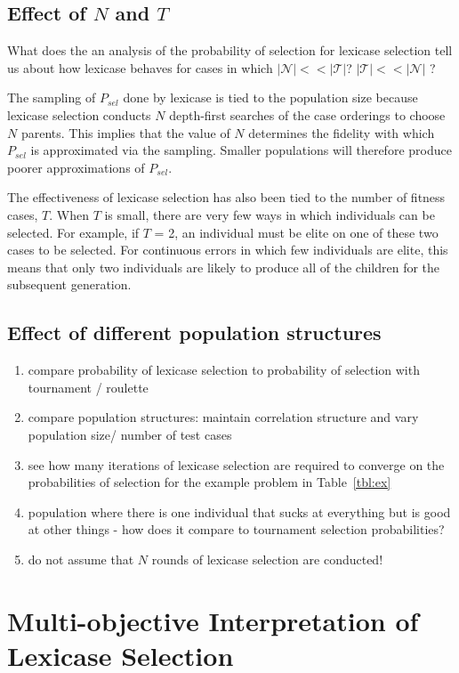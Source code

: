 \documentclass[preprint]{article}
\begin{document}
 
\subsection{Effect of $N$ and $T$}
What does the an analysis of the probability of selection for lexicase selection tell us about how lexicase behaves for cases in which $|\mathcal{N}| << |\mathcal{T}|$?   $|\mathcal{T}| << |\mathcal{N}|$ ? 

The sampling of $P_{sel}$ done by lexicase is tied to the population size because lexicase selection conducts $N$ depth-first searches of the case orderings to choose $N$ parents. This implies that the value of $N$ determines the fidelity with which $P_{sel}$ is approximated via the sampling. Smaller populations will therefore produce poorer approximations of $P_{sel}$. 

The effectiveness of lexicase selection has also been tied to the number of fitness cases, $T$. When $T$ is small, there are very few ways in which individuals can be selected. For example, if $T$ = 2, an individual must be elite on one of these two cases to be selected. For continuous errors in which few individuals are elite, this means that only two individuals are likely to produce all of the children for the subsequent generation.

\subsection{Effect of different population structures}

\begin{enumerate}
\item compare probability of lexicase selection to probability of selection with tournament / roulette 
\item compare population structures: maintain correlation structure and vary population size/ number of test cases
\item see how many iterations of lexicase selection are required to converge on the probabilities of selection for the example problem in Table~\ref{tbl:ex}
\item population where there is one individual that sucks at everything but is good at other things - how does it compare to tournament selection probabilities?
\item do not assume that $N$ rounds of lexicase selection are conducted!
\end{enumerate}

\section{Multi-objective Interpretation of Lexicase Selection}
\end{document}
